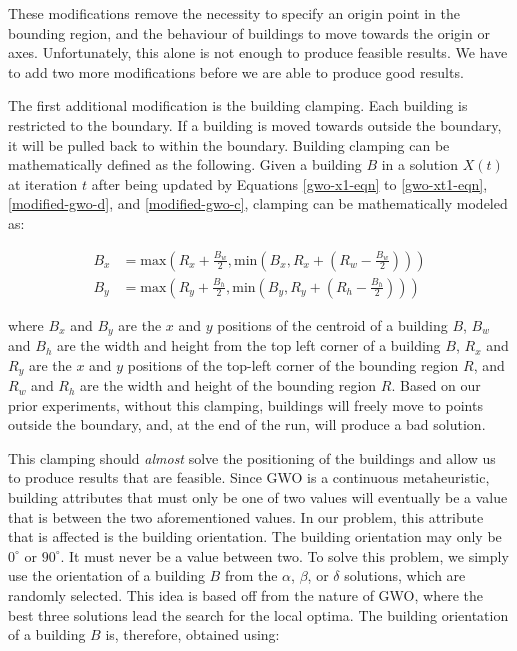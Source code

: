 These modifications remove the necessity to specify an origin point in the bounding region, and the behaviour of buildings to move towards the origin or axes. Unfortunately, this alone is not enough to produce feasible results. We have to add two more modifications before we are able to produce good results.

The first additional modification is the building clamping. Each building is restricted to the boundary. If a building is moved towards outside the boundary, it will be pulled back to within the boundary. Building clamping can be mathematically defined as the following. Given a building $B$ in a solution $X(t)$ at iteration $t$ after being updated by Equations \ref{gwo-x1-eqn} to \ref{gwo-xt1-eqn}, \ref{modified-gwo-d}, and \ref{modified-gwo-c}, clamping can be mathematically modeled as:

\begin{align}
	B_{x} &= \text{max}\left (R_{x} + \frac{B_{w}}{2}, \text{min}\left(B_{x}, R_{x} + \left(R_{w} - \frac{B_{w}}{2}\right)\right)\right ) \label{bx-clamp-equation} \\
	B_{y} &= \text{max}\left (R_{y} + \frac{B_{h}}{2}, \text{min}\left(B_{y}, R_{y} + \left(R_{h} - \frac{B_{h}}{2}\right)\right)\right ) \label{by-clamp-equation}
\end{align}

where $B_{x}$ and $B_{y}$ are the $x$ and $y$ positions of the centroid of a building $B$, $B_{w}$ and $B_{h}$ are the width and height from the top left corner of a building $B$, $R_{x}$ and $R_{y}$ are the $x$ and $y$ positions of the top-left corner of the bounding region $R$, and $R_{w}$ and $R_{h}$ are the width and height of the bounding region $R$. Based on our prior experiments, without this clamping, buildings will freely move to points outside the boundary, and, at the end of the run, will produce a bad solution. 

This clamping should \textit{almost} solve the positioning of the buildings and allow us to produce results that are feasible. Since GWO is a continuous metaheuristic, building attributes that must only be one of two values will eventually be a value that is between the two aforementioned values. In our problem, this attribute that is affected is the building orientation. The building orientation may only be $0^{\circ}$ or $90^{\circ}$. It must never be a value between two. To solve this problem, we simply use the orientation of a building $B$ from the $\alpha$, $\beta$, or $\delta$ solutions, which are randomly selected. This idea is based off from the nature of GWO, where the best three solutions lead the search for the local optima. The building orientation of a building $B$ is, therefore, obtained using:

